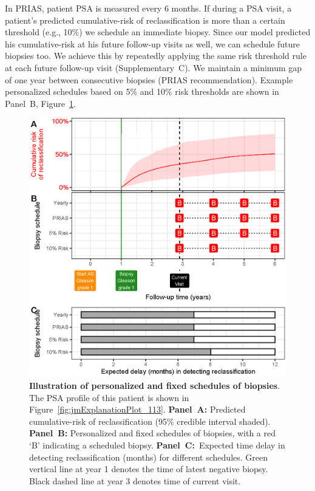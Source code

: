 In PRIAS, patient PSA is measured every 6 months. If during a PSA visit, a patient's predicted cumulative-risk of reclassification is more than a certain threshold (e.g., 10\%) we schedule an immediate biopsy. Since our model predicted his cumulative-risk at his future follow-up visits as well, we can schedule future biopsies too. We achieve this by repeatedly applying the same risk threshold rule at each future follow-up visit (Supplementary~C). We maintain a minimum gap of one year between consecutive biopsies (PRIAS recommendation). Example personalized schedules based on 5\% and 10\% risk thresholds are shown in Panel~B, Figure~\ref{fig:demo_pat1}.

\begin{figure}[!htb]
\centerline{\includegraphics[width=\columnwidth]{images/demo_pat1.eps}}
\caption{\textbf{Illustration of personalized and fixed schedules of biopsies}. The PSA profile of this patient is shown in Figure~\ref{fig:jmExplanationPlot_113}. \textbf{Panel~A:} Predicted cumulative-risk of reclassification (95\% credible interval shaded). \textbf{Panel~B:} Personalized and fixed schedules of biopsies, with a red `B' indicating a scheduled biopsy. \textbf{Panel~C:}\ Expected time delay in detecting reclassification (months) for different schedules. Green vertical line at year 1 denotes the time of latest negative biopsy. Black dashed line at year 3 denotes time of current visit.}
\label{fig:demo_pat1}
\end{figure}

